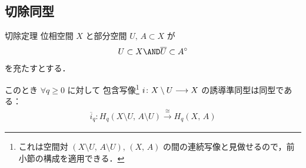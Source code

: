 \documentclass[algtopo_main]{subfiles}
\begin{document}
\subsection{切除同型}

\begin{mytheo}[label=thm:exc]{切除定理}
    位相空間 $X$ と部分空間 $U,\, A \subset X$ が
    \begin{align}
        \label{cond:exc}
        U \subset X \AND \overline{U} \subset A^\circ
    \end{align}
    を充たすとする．
    
    このとき $\forall q \ge 0$ に対して
    包含写像\footnote{これは空間対 $(X\setminus U,\, A \setminus U),\, (X,\, A)$ の間の連続写像と見做せるので，前小節の構成を適用できる．} $i \colon X \setminus U \longrightarrow X$ の誘導準同型は同型である：
    \begin{align}
        \overline{i}_q \colon H_q (X\setminus U,\, A \setminus U) \xrightarrow{\cong} H_q(X,\, A)
    \end{align}
\end{mytheo}
\end{document}
